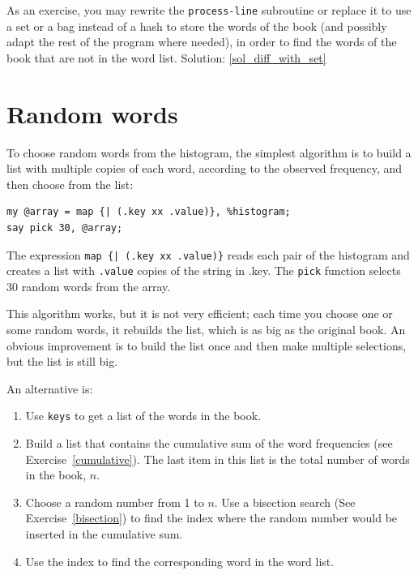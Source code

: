 \label{diff_with_set}
As an exercise, you may rewrite the {\tt process-line} 
subroutine or replace it to use a set or a bag instead of a hash 
to store the words of the book (and possibly adapt the rest of 
the program where needed), in order to find the words of the book 
that are not in the word list.
Solution: \ref{sol_diff_with_set}


\section{Random words}
\label{randomwords}

To choose random words from the histogram, the simplest algorithm
is to build a list with multiple copies of each word, according
to the observed frequency, and then choose from the list:

\begin{verbatim}
my @array = map {| (.key xx .value)}, %histogram;
say pick 30, @array;
\end{verbatim}
%
The expression \verb'map {| (.key xx .value)}' reads each 
pair of the histogram and creates a list with {\tt .value} 
copies of the string in {.key}.  The {\tt pick} function 
selects 30 random words from the array.

This algorithm works, but it is not very efficient; each time you
choose one or some random words, it rebuilds the list, which is 
as big as the original book.  An obvious improvement is to build 
the list once and then make multiple selections, but the list 
is still big.

An alternative is:

\begin{enumerate}

\item Use {\tt keys} to get a list of the words in the book.

\item Build a list that contains the cumulative sum of the word
  frequencies (see Exercise~\ref{cumulative}).  The last item
  in this list is the total number of words in the book, $n$.
  
\item Choose a random number from 1 to $n$.  Use a bisection search
  (See Exercise~\ref{bisection}) to find the index where the random
  number would be inserted in the cumulative sum.

\item Use the index to find the corresponding word in the word list.

\end{enumerate}

